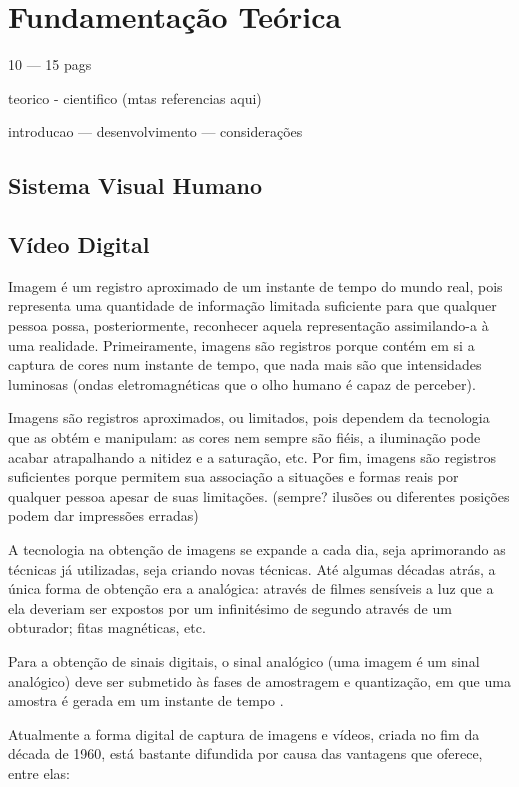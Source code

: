 
\chapter{Fundamentação Teórica}
10 --- 15 pags

teorico - cientifico (mtas referencias aqui)

introducao --- desenvolvimento --- considerações
\section{Sistema Visual Humano}

\section{Vídeo Digital}
Imagem é um registro aproximado de um instante de tempo do mundo real, pois representa uma quantidade de informação limitada suficiente para que qualquer pessoa possa, posteriormente, reconhecer aquela representação assimilando-a à uma realidade. Primeiramente, imagens são registros porque contém em si a captura de cores num instante de tempo, que nada mais são que intensidades luminosas (ondas eletromagnéticas que o olho humano é capaz de perceber).

Imagens são registros aproximados, ou limitados, pois dependem da tecnologia que as obtém e manipulam: as cores nem sempre são fiéis, a iluminação pode acabar atrapalhando a nitidez e a saturação, etc. Por fim, imagens são registros suficientes porque permitem sua associação a situações e formas reais por qualquer pessoa apesar de suas limitações. (sempre? ilusões ou diferentes posições podem dar impressões erradas)

A tecnologia na obtenção de imagens se expande a cada dia, seja aprimorando as técnicas já utilizadas, seja criando novas técnicas. Até algumas décadas atrás, a única forma de obtenção era a analógica: através de filmes sensíveis a luz que a ela deveriam ser expostos por um infinitésimo de segundo através de um obturador; fitas magnéticas, etc.

Para a obtenção de sinais digitais, o sinal analógico (uma imagem é um sinal analógico) deve ser submetido às fases de amostragem e quantização, em que uma amostra é gerada em um instante de tempo \cite{REHME}.

Atualmente a forma digital de captura de imagens e vídeos, criada no fim da década de 1960, está bastante difundida por causa das vantagens que oferece, entre elas:

